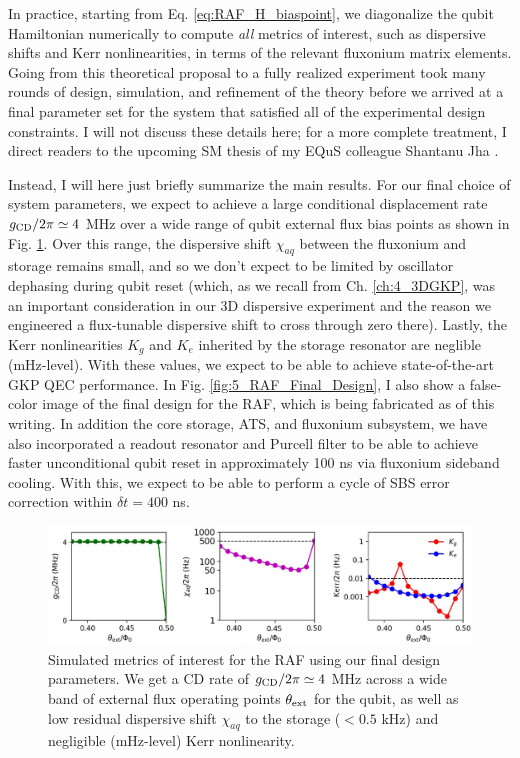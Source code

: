 In practice, starting from Eq. \eqref{eq:RAF_H_biaspoint}, we diagonalize the qubit Hamiltonian numerically to compute \textit{all} metrics of interest, such as dispersive shifts and Kerr nonlinearities, in terms of the relevant fluxonium matrix elements. Going from this theoretical proposal to a fully realized experiment took many rounds of design, simulation, and refinement of the theory before we arrived at a final parameter set for the system that satisfied all of the experimental design constraints. I will not discuss these details here; for a more complete treatment, I direct readers to the upcoming SM thesis of my EQuS colleague Shantanu Jha \cite{shantanu2024thesis}. 

Instead, I will here just briefly summarize the main results. For our final choice of system parameters, we expect to achieve a large conditional displacement rate $g_{\rm CD}/2\pi \simeq 4$ MHz over a wide range of qubit external flux bias points as shown in Fig. \ref{fig:5_RAF_Metrics}. Over this range, the dispersive shift $\chi_{aq}$ between the fluxonium and storage remains small, and so we don't expect to be limited by oscillator dephasing during qubit reset (which, as we recall from Ch. \ref{ch:4_3DGKP}, was an important consideration in our 3D dispersive experiment and the reason we engineered a flux-tunable dispersive shift to cross through zero there). Lastly, the Kerr nonlinearities $K_g$ and $K_e$ inherited by the storage resonator are neglible (mHz-level). With these values, we expect to be able to achieve state-of-the-art GKP QEC performance. In Fig. \ref{fig:5_RAF_Final_Design}, I also show a false-color image of the final design for the RAF, which is being fabricated as of this writing. In addition the core storage, ATS, and fluxonium subsystem, we have also incorporated a readout resonator and Purcell filter to be able to achieve faster unconditional qubit reset in approximately 100 ns via fluxonium sideband cooling. With this, we expect to be able to perform a cycle of SBS error correction within $\delta t = 400$ ns.

\begin{figure}[h]
    \centering
    \includegraphics[width=0.95\linewidth]{Figures/5/RAF_Metrics.pdf}
    \caption[Simulated metrics of interest for the Resonator-ATS-Fluxonium (RAF) experiment in 2D.]{Simulated metrics of interest for the RAF using our final design parameters. We get a CD rate of $g_{\rm CD}/2\pi \simeq 4$ MHz across a wide band of external flux operating points $\theta_{\rm ext}$ for the qubit, as well as low residual dispersive shift $\chi_{aq}$ to the storage ($< 0.5$ kHz) and negligible (mHz-level) Kerr nonlinearity.}
    \label{fig:5_RAF_Metrics}
\end{figure}

